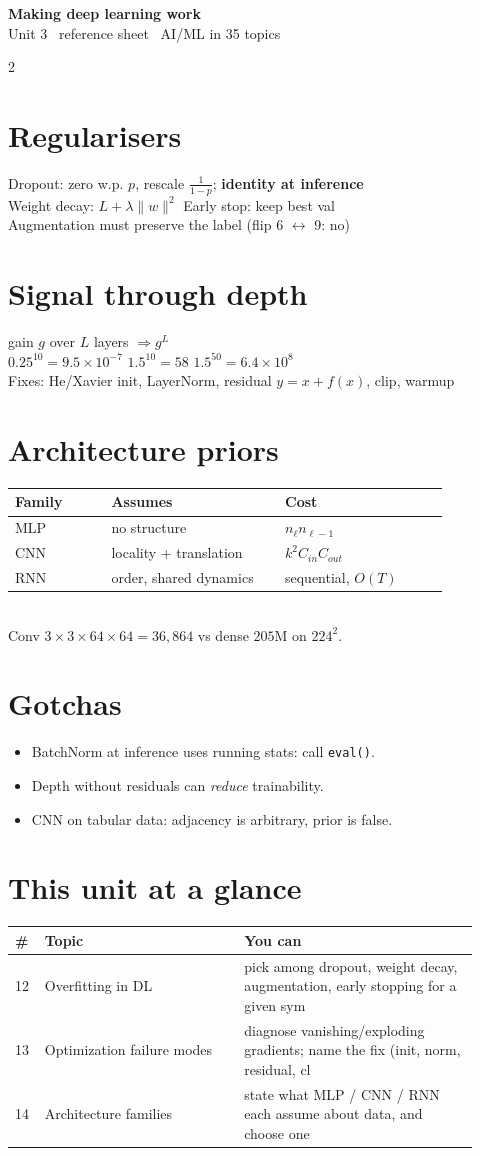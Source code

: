 \documentclass[11pt,a4paper]{article}
\newcommand{\sect}[1]{\section*{#1}}
\newcommand{\hd}[2]{\begin{center}{\large\bfseries #1}\\[-0.1em]{\small\color{gray}#2}\end{center}\vspace{-0.6em}}
\begin{document}
\hd{Making deep learning work}{Unit 3 \textperiodcentered\ reference sheet \textperiodcentered\ AI/ML in 35 topics}
\begin{multicols}{2}
\normalsize

\sect{Regularisers}
Dropout: zero w.p. $p$, rescale $\frac{1}{1-p}$; \textbf{identity at inference}\\
Weight decay: $L+\lambda\|w\|^2$ \quad Early stop: keep best val\\
Augmentation must preserve the label (flip 6 $\leftrightarrow$ 9: no)

\sect{Signal through depth}
gain $g$ over $L$ layers $\Rightarrow g^L$\\
$0.25^{10}=9.5\times10^{-7}$ \quad $1.5^{10}=58$ \quad $1.5^{50}=6.4\times10^{8}$\\
Fixes: He/Xavier init, LayerNorm, residual $y=x+f(x)$, clip, warmup

\sect{Architecture priors}
\begin{tabular}{@{}p{0.2\linewidth}p{0.36\linewidth}p{0.34\linewidth}@{}}
\toprule
Family & Assumes & Cost\\
\midrule
MLP & no structure & $n_\ell n_{\ell-1}$\\
CNN & locality + translation & $k^2C_{in}C_{out}$\\
RNN & order, shared dynamics & sequential, $O(T)$\\
\bottomrule
\end{tabular}\\
Conv $3\times3\times64\times64=36{,}864$ vs dense $205$M on $224^2$.

\sect{Gotchas}
\begin{itemize}
\item BatchNorm at inference uses running stats: call \texttt{eval()}.
\item Depth without residuals can \emph{reduce} trainability.
\item CNN on tabular data: adjacency is arbitrary, prior is false.
\end{itemize}

\sect{This unit at a glance}
\begin{tabular}{@{}p{0.05\linewidth}p{0.40\linewidth}p{0.47\linewidth}@{}}
\toprule
\# & Topic & You can\\
\midrule
12 & Overfitting in DL & pick among dropout, weight decay, augmentation, early stopping for a given sym\\
13 & Optimization failure modes & diagnose vanishing/exploding gradients; name the fix (init, norm, residual, cl\\
14 & Architecture families & state what MLP / CNN / RNN each assume about data, and choose one\\
\bottomrule
\end{tabular}


\end{multicols}
\end{document}
